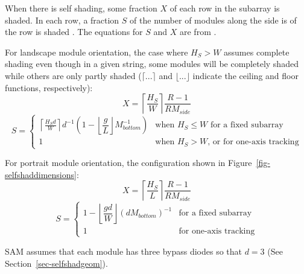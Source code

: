 \documentclass[12pt,letterpaper]{article}
\begin{document}
When there is self shading, some fraction $X$ of each row in the subarray is shaded. In each row, a fraction $S$ of the number of modules along the side is of the row is shaded \citep{deline2013a}. The equations for $S$ and $X$ are from \citet{deline2013b}.

For landscape module orientation, the case where $H_S>W$ assumes complete shading even though in a given string, some modules will be completely shaded while others are only partly shaded ($\lceil...\rceil$ and $\lfloor...\rfloor$ indicate the ceiling and floor functions, respectively): 
\begin{equation}
X = \left\lceil\frac{H_S}{W}\right\rceil \dfrac{R-1}{R M_{side}}
\end{equation}
\[
S=
  \left\{
    \begin{array}{ll}
      \left\lceil \frac{H_S d}{W} \right
      \rceil d^{-1} 
      \left(1-\left\lfloor\dfrac{g}{L}\right\rfloor M^{-1}_{bottom}\right) 
      & \mbox{when $H_S\le W$ for a fixed subarray}\\
      1 
      & \mbox{when $H_S> W$, or for one-axis tracking}
    \end{array}
  \right.
\]

For portrait module orientation, the configuration shown in Figure~\ref{fig-selfshaddimensions}: 
\begin{equation}
X = \left\lceil \frac{H_S}{L} \right\rceil \dfrac{R-1}{R M_{side}}
\end{equation}
\[
S=
 \left\{
     \begin{array}{ll}
      1-\left\lfloor \dfrac{gd}{W}\right\rfloor \left(d M_{bottom}\right)^{-1} 
      & \mbox{for a fixed subarray}\\
      1 
      & \mbox{for one-axis tracking}
    \end{array}
  \right.
\]


SAM assumes that each module has three bypass diodes so that $d=3$ (See  Section~\ref{sec-selfshadgeom}).

\end{document}
